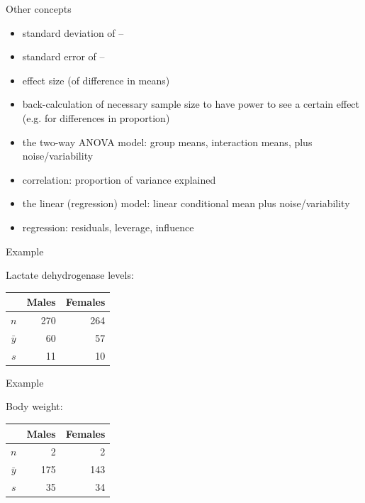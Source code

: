\begin{frame}{Other concepts}
  
  \begin{itemize}
    \item standard deviation of --
    \item standard error of --
    \item effect size (of difference in means)
    \item back-calculation of necessary sample size to have power to see a certain effect (e.g. for differences in proportion)
    \item the two-way ANOVA model: group means, interaction means, plus noise/variability
    \item correlation: proportion of variance explained
    \item the linear (regression) model: linear conditional mean plus noise/variability
    \item regression: residuals, leverage, influence
  \end{itemize}


\end{frame}

%

\begin{frame}{Example}

  Lactate dehydrogenase levels:
  \begin{center}
    \begin{tabular}{crr}
       & Males & Females \\
       \hline
       $n$ & 270 & 264 \\
       $\bar y$ & 60 & 57 \\
       $s$ & 11 & 10
     \end{tabular}

   \vspace{2em}

   \end{center}

\end{frame}



\begin{frame}{Example}

  Body weight:
  \begin{center}
    \begin{tabular}{crr}
       & Males & Females \\
       \hline
       $n$ & 2 & 2 \\
       $\bar y$ & 175 & 143 \\
       $s$ & 35 & 34
     \end{tabular}

   \vspace{2em}

   \end{center}

\end{frame}


